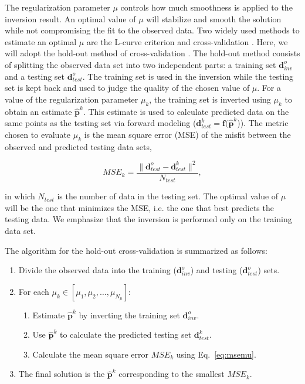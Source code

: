 \documentclass[extra,mreferee]{gji}
\begin{document}
The regularization parameter $\mu$ controls how much smoothness is applied to
the inversion result.
An optimal value of $\mu$ will stabilize and smooth the solution while not
compromising the fit to the observed data.
Two widely used methods to estimate an optimal $\mu$ are
the L-curve criterion and cross-validation \citep{hansen1992}.
Here, we will adopt the hold-out method of cross-validation \citep{kim2009}.
The hold-out method consists of splitting the observed data set into two
independent parts:
a training set $\mathbf{d}^o_{inv}$
and a testing set $\mathbf{d}^o_{test}$.
The training set is used in the inversion
while the testing set is kept back
and used to judge the quality of the chosen value of $\mu$.
For a value of the regularization parameter $\mu_k$,
the training set is inverted using $\mu_k$
to obtain an estimate $\mathbf{\hat{p}}^k$.
This estimate is used to calculate predicted data
on the same points as the testing set
via forward modeling
($\mathbf{d}_{test}^k = \mathbf{f}(\mathbf{\hat{p}}^k$)).
The metric chosen to evaluate $\mu_k$ is
the mean square error (MSE) of the misfit
between the observed and predicted testing data sets,

\begin{equation}
    MSE_k = \dfrac{\|\mathbf{d}^o_{test} - \mathbf{d}^k_{test}\|^2}{N_{test}},
    \label{eq:msemu}
\end{equation}

\noindent
in which $N_{test}$ is the number of data in the testing set.
The optimal value of $\mu$ will be the one that minimizes the MSE,
i.e. the one that best predicts the testing data.
We emphasize that the inversion is performed only on the training data set.

The algorithm for the hold-out cross-validation is summarized as follows:

\begin{enumerate}
    \item Divide the observed data into
        the training ($\mathbf{d}^o_{inv}$)
        and testing ($\mathbf{d}^o_{test}$) sets.
    \item For each $\mu_k \in [\mu_1, \mu_2, \ldots, \mu_{N_{\mu}}]$:
    \begin{enumerate}
        \item Estimate $\mathbf{\hat{p}}^k$ by inverting the training set
            $\mathbf{d}^o_{inv}$.
        \item Use $\mathbf{\hat{p}}^k$ to calculate the predicted testing set
            $\mathbf{d}^k_{test}$.
        \item Calculate the mean square error $MSE_k$ using Eq.~\ref{eq:msemu}.
    \end{enumerate}
    \item The final solution is the $\mathbf{\hat{p}}^k$ corresponding to the
        smallest $MSE_k$.
\end{enumerate}
\end{document}
